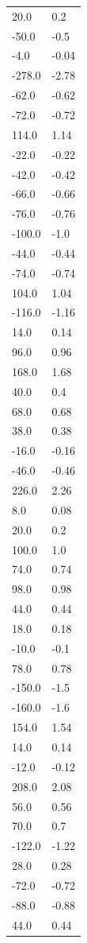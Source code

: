 \begin{longtable}{ll}
20.0 & 0.2 \\
-50.0 & -0.5 \\
-4.0 & -0.04 \\
-278.0 & -2.78 \\
-62.0 & -0.62 \\
-72.0 & -0.72 \\
114.0 & 1.14 \\
-22.0 & -0.22 \\
-42.0 & -0.42 \\
-66.0 & -0.66 \\
-76.0 & -0.76 \\
-100.0 & -1.0 \\
-44.0 & -0.44 \\
-74.0 & -0.74 \\
104.0 & 1.04 \\
-116.0 & -1.16 \\
14.0 & 0.14 \\
96.0 & 0.96 \\
168.0 & 1.68 \\
40.0 & 0.4 \\
68.0 & 0.68 \\
38.0 & 0.38 \\
-16.0 & -0.16 \\
-46.0 & -0.46 \\
226.0 & 2.26 \\
8.0 & 0.08 \\
20.0 & 0.2 \\
100.0 & 1.0 \\
74.0 & 0.74 \\
98.0 & 0.98 \\
44.0 & 0.44 \\
18.0 & 0.18 \\
-10.0 & -0.1 \\
78.0 & 0.78 \\
-150.0 & -1.5 \\
-160.0 & -1.6 \\
154.0 & 1.54 \\
14.0 & 0.14 \\
-12.0 & -0.12 \\
208.0 & 2.08 \\
56.0 & 0.56 \\
70.0 & 0.7 \\
-122.0 & -1.22 \\
28.0 & 0.28 \\
-72.0 & -0.72 \\
-88.0 & -0.88 \\
44.0 & 0.44 \\

\end{longtable}
